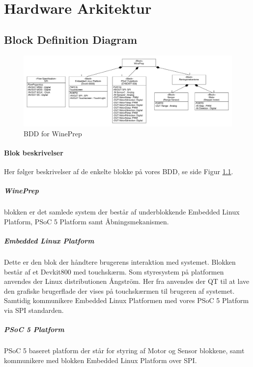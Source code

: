 \chapter{Hardware Arkitektur}

\section{Block Definition Diagram}

\begin{figure}[H]
	\centering
	\includegraphics[scale=0.3]{blockdefinitiondiagram}
	\caption{BDD for WinePrep}
	\label{BDD}
\end{figure}

\subsubsection{Blok beskrivelser}
Her følger beskrivelser af de enkelte blokke på vores BDD, se side \pageref{BDD} Figur \ref{BDD}.

\paragraph{WinePrep} blokken er det samlede system der består af underblokkende Embedded Linux Platform, PSoC 5 Platform samt Åbningsmekanismen.

\paragraph{Embedded Linux Platform} Dette er den blok der håndtere brugerens interaktion med systemet. Blokken består af et Devkit800 med touchskærm. Som styresystem på platformen anvendes der Linux distributionen Ångström. Her fra anvendes der QT til at lave den grafiske brugerflade der vises på touchskærmen til brugeren af systemet. Samtidig kommunikere Embedded Linux Platformen med vores PSoC 5 Platform via SPI standarden.

\paragraph{PSoC 5 Platform} PSoC 5 baseret platform der står for styring af Motor og Sensor blokkene, samt kommunikere med blokken Embedded Linux Platform over SPI.

